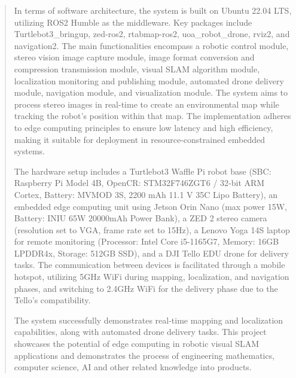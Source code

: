 \documentclass[MSc]{abdnthesis}
\begin{document}
\begin{abstract}
  In terms of software architecture, the system is built on Ubuntu 22.04 LTS, utilizing ROS2 Humble as the middleware. Key packages include Turtlebot3\_bringup, zed-ros2, rtabmap-ros2, uoa\_robot\_drone, rviz2, and navigation2. The main functionalities encompass a robotic control module, stereo vision image capture module, image format conversion and compression transmission module, visual SLAM algorithm module, localization monitoring and publishing module, automated drone delivery module, navigation module, and visualization module. The system aims to process stereo images in real-time to create an environmental map while tracking the robot's position within that map. The implementation adheres to edge computing principles to ensure low latency and high efficiency, making it suitable for deployment in resource-constrained embedded systems.
  
  The hardware setup includes a Turtlebot3 Waffle Pi robot base (SBC: Raspberry Pi Model 4B, OpenCR: STM32F746ZGT6 / 32-bit ARM Cortex, Battery: MVMOD 3S, 2200 mAh 11.1 V 35C Lipo Battery), an embedded edge computing unit using Jetson Orin Nano (max power 15W, Battery: INIU 65W 20000mAh Power Bank), a ZED 2 stereo camera (resolution set to VGA, frame rate set to 15Hz), a Lenovo Yoga 14S laptop for remote monitoring (Processor: Intel Core i5-1165G7, Memory: 16GB LPDDR4x, Storage: 512GB SSD), and a DJI Tello EDU drone for delivery tasks. The communication between devices is facilitated through a mobile hotspot, utilizing 5GHz WiFi during mapping, localization, and navigation phases, and switching to 2.4GHz WiFi for the delivery phase due to the Tello's compatibility.
  
  The system successfully demonstrates real-time mapping and localization capabilities, along with automated drone delivery tasks. This project showcases the potential of edge computing in robotic visual SLAM applications and demonstrates the process of engineering mathematics, computer science, AI and other related knowledge into products.

\end{abstract}
\end{document}
